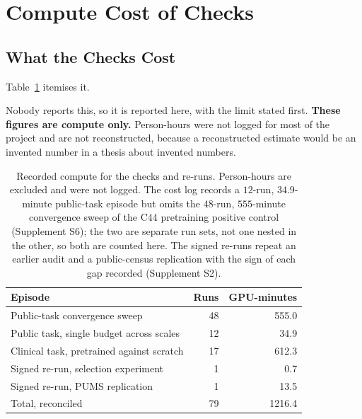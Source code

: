 %

\section{Compute Cost of Checks}
\label{sup:s4}

\subsection{What the Checks Cost}

Table~\ref{sup:tab:disc-cost} itemises it.
\label{sup:sec:disc-cost}

Nobody reports this, so it is reported here, with the limit stated first.
\textbf{These figures are compute only.} Person-hours were not logged for most
of the project and are not reconstructed, because a reconstructed estimate
would be an invented number in a thesis about invented numbers.

\begin{table}[H]
\centering
\caption[Recorded compute cost of checks]{Recorded compute for the checks and re-runs. Person-hours are excluded and were
not logged. The cost log records a $12$-run, $34.9$-minute public-task episode
but omits the $48$-run, $555$-minute convergence sweep of the C44 pretraining positive
control (Supplement S6); the two are separate run sets, not one nested in the other, so both
are counted here. The signed re-runs repeat an earlier audit and a public-census replication
with the sign of each gap recorded (Supplement S2).}
\label{sup:tab:disc-cost}
\begin{tabular}{lrr}
\toprule
\textbf{Episode} & \textbf{Runs} & \textbf{GPU-minutes} \\
\midrule
Public-task convergence sweep             & 48 & 555.0 \\
Public task, single budget across scales  & 12 & 34.9 \\
Clinical task, pretrained against scratch & 17 & 612.3 \\
Signed re-run, selection experiment       & 1  & 0.7 \\
Signed re-run, PUMS replication           & 1  & 13.5 \\
\midrule
Total, reconciled                         & 79 & 1216.4 \\
\bottomrule
\end{tabular}
\end{table}


